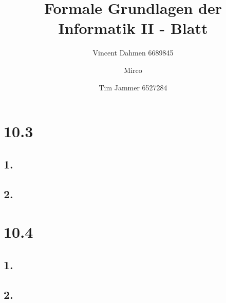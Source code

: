 \documentclass[12pt,a4paper]{article}
\title{Formale Grundlagen der Informatik II - Blatt \blattNr}
\author{Vincent Dahmen 6689845  \and Mirco \and Tim Jammer 6527284}
\def \blattNr{10}
\begin{document}
\maketitle{}

\section*{\blattNr .3}
\subsection*{1.}



\subsection*{2.}


%

%

%
%
%

\pagebreak

\section*{\blattNr .4}

\subsection*{1.}


%
\subsection*{2.}

\end{document}
